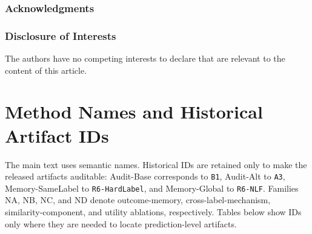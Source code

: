 \documentclass[runningheads]{llncs}
\begin{document}
\begin{credits}
\subsubsection{Acknowledgments}

\subsubsection{Disclosure of Interests}
The authors have no competing interests to declare that are relevant to the
content of this article.
\end{credits}

\appendix
\section{Method Names and Historical Artifact IDs}
\label{sec:name-map}
The main text uses semantic names. Historical IDs are retained only to make
the released artifacts auditable: Audit-Base corresponds to \texttt{B1}, Audit-Alt to
\texttt{A3}, Memory-SameLabel to \texttt{R6-HardLabel}, and Memory-Global to
\texttt{R6-NLF}. Families NA,
NB, NC, and ND denote outcome-memory, cross-label-mechanism,
similarity-component, and utility ablations, respectively. Tables below show
IDs only where they are needed to locate prediction-level artifacts.
\end{document}
